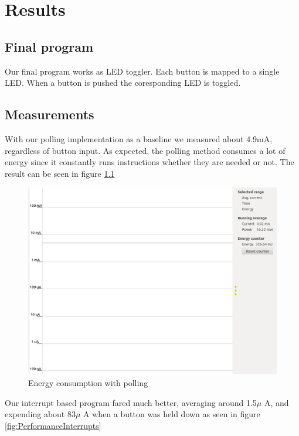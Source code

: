 \chapter{Results}

\section{Final program}
Our final program works as LED toggler. Each button is mapped to a single LED. When a button is pushed the coresponding LED is toggled.

\section{Measurements}
With our polling implementation as a baseline we measured about 4.9mA, regardless of button input. As expected, the polling method consumes a lot of energy since it constantly runs instructions whether they are needed or not. The result can be seen in figure \ref{fig:PerformancePolling}

\begin{figure}[ht]
 \centering
 \includegraphics[width=\textwidth]{images/performance_with_polling.png}
 \caption{Energy consumption with polling}
 \label{fig:PerformancePolling}
\end{figure}

Our interrupt based program fared much better, averaging around 1.5$\mu$ A, and expending about 83$\mu$ A when a button was held down as seen in figure \ref{fig:PerformanceInterrupts}

